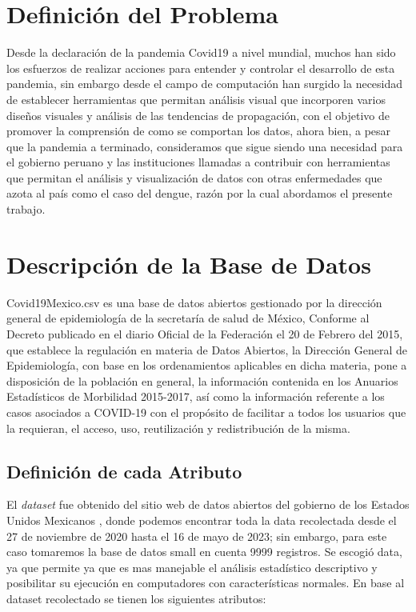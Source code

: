 %
%

\section{Definición del Problema}

Desde la declaración de la pandemia Covid19 a nivel mundial, muchos han sido los esfuerzos de realizar acciones para entender y controlar el desarrollo de esta pandemia, sin embargo desde el campo de computación han surgido la necesidad de establecer herramientas que permitan análisis visual que incorporen varios diseños visuales y análisis de las tendencias de propagación, con el objetivo de promover la comprensión de como se comportan los datos, ahora bien, a pesar que la pandemia a terminado, consideramos que sigue siendo una necesidad para el gobierno peruano y las instituciones llamadas a contribuir con herramientas que permitan el análisis y visualización de datos con otras enfermedades que azota al país como el caso del dengue, razón por la cual abordamos el presente trabajo.

 
\section{Descripción de la Base de Datos}


Covid19Mexico.csv es una base de datos abiertos gestionado por la dirección general de epidemiología de la secretaría de salud de México, Conforme al Decreto publicado en el diario Oficial de la Federación el 20 de Febrero del 2015, que establece la regulación en materia de Datos Abiertos, la Dirección General de Epidemiología, con base en los ordenamientos aplicables en dicha materia, pone a disposición de la población en general, la información contenida en los Anuarios Estadísticos de Morbilidad 2015-2017, así como la información referente a los casos asociados a COVID-19 con el propósito de facilitar a todos los usuarios que la requieran, el acceso, uso, reutilización y redistribución de la misma.


\subsection{Definición de cada Atributo}
El \textit{dataset} fue obtenido del sitio web de datos abiertos del gobierno de los Estados Unidos Mexicanos , donde podemos encontrar toda la data
recolectada desde el 27 de noviembre de 2020 hasta el 16 de mayo de 2023; sin embargo, para este caso  tomaremos la base de datos small en cuenta 9999 registros. Se escogió data, ya que permite ya que es mas manejable el análisis estadístico descriptivo y posibilitar su ejecución en computadores con características normales. En base al dataset recolectado se tienen los siguientes atributos:

